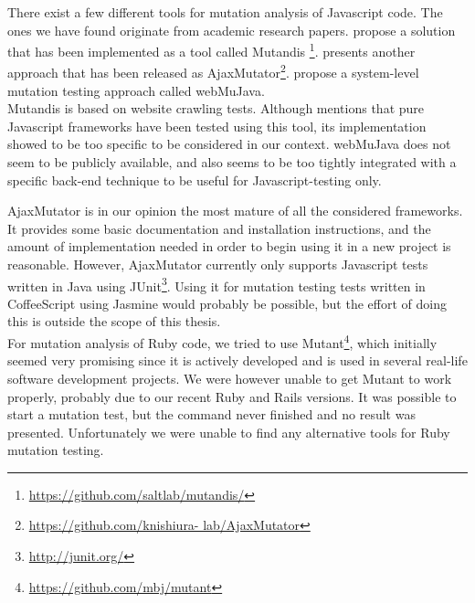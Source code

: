 \label{sec:choices_mutation}

There exist a few different tools for mutation analysis of Javascript
code. The ones we have found originate from academic research papers.
\citet{paper:mutandis} propose a solution that has been implemented as
a tool called Mutandis
\footnote{\url{https://github.com/saltlab/mutandis/}}.
\citet{paper:ajaxmutator} presents another approach that has been
released as AjaxMutator\footnote{\url{https://github.com/knishiura-
lab/AjaxMutator}}. \citet{paper:webmujava} propose a system-level
mutation testing approach called webMuJava.\\

Mutandis is based on website crawling tests. Although
\citeauthor{paper:mutandis} mentions that pure Javascript frameworks
have been tested using this tool, its implementation showed to be too
specific to be considered in our context. webMuJava does not seem to be
publicly available, and also seems to be too tightly integrated with a
specific back-end technique to be useful for Javascript-testing only.

AjaxMutator is in our opinion the most mature of all the considered
frameworks. It provides some basic documentation and installation
instructions, and the amount of implementation needed in order to begin
using it in a new project is reasonable. However, AjaxMutator currently
only supports Javascript tests written in Java using
JUnit\footnote{\url{http://junit.org/}}. Using it for mutation testing
tests written in CoffeeScript using Jasmine would probably be possible,
but the effort of doing this is outside the scope of this thesis.\\

For mutation analysis of Ruby code, we tried to use
Mutant\footnote{\url{https://github.com/mbj/mutant}}, which initially
seemed very promising since it is actively developed and is used in
several real-life software development projects. We were however unable
to get Mutant to work properly, probably due to our recent Ruby and
Rails versions. It was possible to start a mutation test, but the
command never finished and no result was presented. Unfortunately we
were unable to find any alternative tools for Ruby mutation testing.\\
